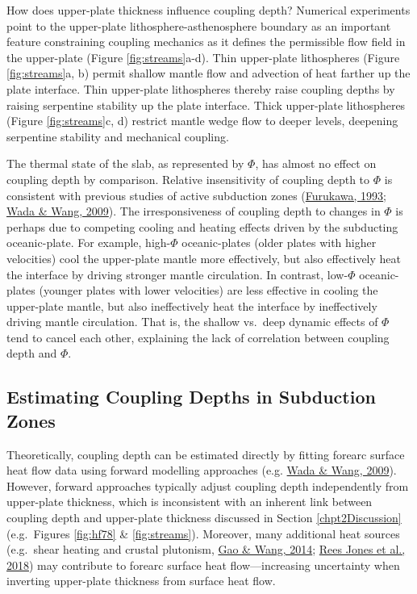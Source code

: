 How does upper-plate thickness influence coupling depth? Numerical experiments point to the upper-plate lithosphere-asthenosphere boundary as an important feature constraining coupling mechanics as it defines the permissible flow field in the upper-plate (Figure \ref{fig:streams}a-d). Thin upper-plate lithospheres (Figure \ref{fig:streams}a, b) permit shallow mantle flow and advection of heat farther up the plate interface. Thin upper-plate lithospheres thereby raise coupling depths by raising serpentine stability up the plate interface. Thick upper-plate lithospheres (Figure \ref{fig:streams}c, d) restrict mantle wedge flow to deeper levels, deepening serpentine stability and mechanical coupling.

The thermal state of the slab, as represented by \(\Phi\), has almost no effect on coupling depth by comparison. Relative insensitivity of coupling depth to \(\Phi\) is consistent with previous studies of active subduction zones (\protect\hyperlink{ref-furukawa1993}{Furukawa, 1993}; \protect\hyperlink{ref-wada2009}{Wada \& Wang, 2009}). The irresponsiveness of coupling depth to changes in \(\Phi\) is perhaps due to competing cooling and heating effects driven by the subducting oceanic-plate. For example, high-\(\Phi\) oceanic-plates (older plates with higher velocities) cool the upper-plate mantle more effectively, but also effectively heat the interface by driving stronger mantle circulation. In contrast, low-\(\Phi\) oceanic-plates (younger plates with lower velocities) are less effective in cooling the upper-plate mantle, but also ineffectively heat the interface by ineffectively driving mantle circulation. That is, the shallow vs.~deep dynamic effects of \(\Phi\) tend to cancel each other, explaining the lack of correlation between coupling depth and \(\Phi\).

\hypertarget{estimating-coupling-depths-in-subduction-zones}{%
\subsection{Estimating Coupling Depths in Subduction Zones}\label{estimating-coupling-depths-in-subduction-zones}}

Theoretically, coupling depth can be estimated directly by fitting forearc surface heat flow data using forward modelling approaches (e.g. \protect\hyperlink{ref-wada2009}{Wada \& Wang, 2009}). However, forward approaches typically adjust coupling depth independently from upper-plate thickness, which is inconsistent with an inherent link between coupling depth and upper-plate thickness discussed in Section \ref{chpt2Discussion} (e.g.~Figures \ref{fig:hf78} \& \ref{fig:streams}). Moreover, many additional heat sources (e.g.~shear heating and crustal plutonism, \protect\hyperlink{ref-gao2014}{Gao \& Wang, 2014}; \protect\hyperlink{ref-reesjones2018}{Rees Jones et al., 2018}) may contribute to forearc surface heat flow---increasing uncertainty when inverting upper-plate thickness from surface heat flow.

